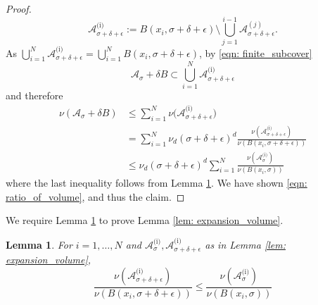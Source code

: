 \documentclass[11pt,twoside]{article}
\newtheorem{lemma}{Lemma}
\theoremstyle{definition}
\newcommand{\1}{\mathbbm{1}}
\newcommand{\Aset}{\mathcal{A}}
\newcommand{\Asig}{\Aset_{\sigma}}
\begin{document}
\begin{proof}
	\begin{equation*}
	\Aset_{\sigma + \delta + \epsilon}^{\text{(i)}} := B(x_i,\sigma + \delta + \epsilon) \setminus \bigcup_{j = 1}^{i - 1} \Aset_{\sigma + \delta + \epsilon}^{(j)}. \tag{$i = 2,\ldots,N$}
	\end{equation*}
As $\bigcup_{i = 1}^{N} \Aset_{\sigma + \delta + \epsilon}^{\text{(i)}} = \bigcup_{i = 1}^{N} B(x_i,\sigma + \delta + \epsilon)$, by \eqref{eqn: finite_subcover}
	\begin{equation*}
	\Aset_{\sigma} + \delta B \subset \bigcup_{i =1}^{N} \Aset_{\sigma + \delta + \epsilon}^{\text{(i)}}
	\end{equation*}
	and therefore 
	\begin{align*}
	\nu(\Aset_\sigma + \delta B) & \leq \sum_{i = 1}^{N} \nu\bigl(\Aset_{\sigma + \delta + \epsilon}^{\text{(i)}}\bigr) \\
	& = \sum_{i = 1}^{N} \nu_d (\sigma + \delta + \epsilon)^d \frac{\nu(\Aset_{\sigma + \delta + \epsilon}^{\text{(i)}})}{\nu(B(x_i, \sigma + \delta + \epsilon))} \\
	& \leq \nu_d (\sigma + \delta + \epsilon)^d \sum_{i = 1}^{N} \frac{\nu(\Asig^{\text{(i)}})}{\nu(B(x_i,\sigma))}
	\end{align*}
	where the last inequality follows from Lemma \ref{lem: covering}. We have shown \eqref{eqn: ratio_of_volume}, and thus the claim.
\end{proof}
\noindent We require Lemma \ref{lem: covering} to prove Lemma \ref{lem: expansion_volume}.
\begin{lemma}
	\label{lem: covering}
	For $i = 1, \ldots, N$ and  $\Aset_{\sigma}^{\text{(i)}}, \Aset_{\sigma + \delta + \epsilon}^{\text{(i)}}$ as in Lemma \ref{lem: expansion_volume},
	\begin{equation*}
	\frac{\nu(\Aset_{\sigma + \delta + \epsilon}^{\text{(i)}})}{\nu(B(x_i, \sigma + \delta + \epsilon))} \leq \frac{\nu(\Aset_{\sigma}^{\text{(i)}})}{\nu(B(x_i, \sigma))}
	\end{equation*}
\end{lemma}
\end{document}

